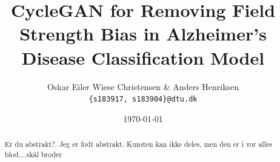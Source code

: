 \documentclass[12pt, fleqn, titlepage]{article}
\title{CycleGAN for Removing Field Strength Bias in Alzheimer's Disease Classification Model}
\author{Oskar Eiler Wiese Christensen \& Anders Henriksen \\ \texttt{\{s183917, s183904\}@dtu.dk}}
\date{\today}
\begin{document}
\maketitle
\begin{abstract}
	\small
	\noindent
	Er du abstrakt?. Jeg er født abstrakt. 
	Kunsten kan ikke deles, men den er i vor alles blod....skål broder
	
\end{abstract}
\end{document}
